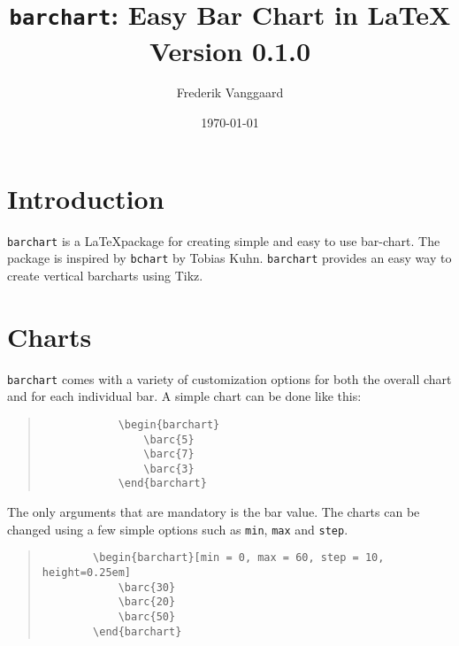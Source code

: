 \documentclass[]{article}
\title{\texttt{barchart}: Easy Bar Chart in \LaTeX
	\medskip\\
	\large Version 0.1.0
}
\author{Frederik Vanggaard}
\date{\today}
\begin{document}
\maketitle

\section{Introduction}
\texttt{barchart} is a \LaTeX\space package for creating simple and easy to use bar-chart. The package is inspired by \texttt{bchart} by Tobias Kuhn. \texttt{barchart} provides an easy way to create vertical barcharts using Tikz.  

\section{Charts}
\texttt{barchart} comes with a variety of customization options for both the overall chart and for each individual bar. A simple chart can be done like this:


\begin{center}
	\begin{minipage}[l][][c]{0.45\linewidth} 
		\begin{quote}\small
		\begin{verbatim}
			\begin{barchart}
			    \barc{5}
			    \barc{7}
			    \barc{3}
			\end{barchart}
		\end{verbatim}
		\end{quote}
		\end{minipage}
		\quad
		\begin{minipage}[r][][c]{0.45\linewidth}
		\begin{barchart}
		\end{barchart}
	\end{minipage}
\end{center}

The only arguments that are mandatory is the bar value. The charts can be changed using a few simple options such as \texttt{min}, \texttt{max} and \texttt{step}.

\begin{quote}\small
	\begin{verbatim}
		\begin{barchart}[min = 0, max = 60, step = 10, height=0.25em]
			\barc{30}
			\barc{20}
			\barc{50}
		\end{barchart}
	\end{verbatim}
\end{quote}
\begin{quote}\small
	\begin{barchart}[min = 0, max = 60, step = 10, height=0.25em]
	\end{barchart}
\end{quote}
\end{document}

